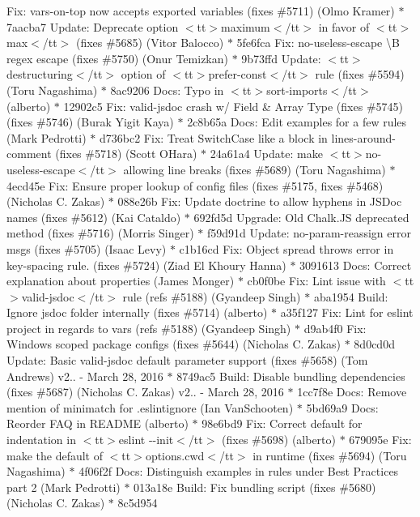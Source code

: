\begin{DoxyItemize}
Fix\+: vars-\/on-\/top now accepts exported variables (fixes \#5711) (\+Olmo Kramer) \texorpdfstring{$\ast$}{*} 7aacba7 Update\+: Deprecate option $<$tt$>$maximum$<$/tt$>$ in favor of $<$tt$>$max$<$/tt$>$ (fixes \#5685) (\+Vitor Balocco) \texorpdfstring{$\ast$}{*} 5fe6fca Fix\+: no-\/useless-\/escape \textbackslash{}\+B regex escape (fixes \#5750) (\+Onur Temizkan) \texorpdfstring{$\ast$}{*} 9b73ffd Update\+: $<$tt$>$destructuring$<$/tt$>$ option of $<$tt$>$prefer-\/const$<$/tt$>$ rule (fixes \#5594) (\+Toru Nagashima) \texorpdfstring{$\ast$}{*} 8ac9206 Docs\+: Typo in $<$tt$>$sort-\/imports$<$/tt$>$ (alberto) \texorpdfstring{$\ast$}{*} 12902c5 Fix\+: valid-\/jsdoc crash w/ Field \& Array Type (fixes \#5745) (fixes \#5746) (\+Burak Yigit Kaya) \texorpdfstring{$\ast$}{*} 2c8b65a Docs\+: Edit examples for a few rules (\+Mark Pedrotti) \texorpdfstring{$\ast$}{*} d736bc2 Fix\+: Treat Switch\+Case like a block in lines-\/around-\/comment (fixes \#5718) (\+Scott O\textquotesingle{}\+Hara) \texorpdfstring{$\ast$}{*} 24a61a4 Update\+: make $<$tt$>$no-\/useless-\/escape$<$/tt$>$ allowing line breaks (fixes \#5689) (\+Toru Nagashima) \texorpdfstring{$\ast$}{*} 4ecd45e Fix\+: Ensure proper lookup of config files (fixes \#5175, fixes \#5468) (\+Nicholas C. Zakas) \texorpdfstring{$\ast$}{*} 088e26b Fix\+: Update doctrine to allow hyphens in JSDoc names (fixes \#5612) (\+Kai Cataldo) \texorpdfstring{$\ast$}{*} 692fd5d Upgrade\+: Old Chalk.\+JS deprecated method (fixes \#5716) (\+Morris Singer) \texorpdfstring{$\ast$}{*} f59d91d Update\+: no-\/param-\/reassign error msgs (fixes \#5705) (\+Isaac Levy) \texorpdfstring{$\ast$}{*} c1b16cd Fix\+: Object spread throws error in key-\/spacing rule. (fixes \#5724) (\+Ziad El Khoury Hanna) \texorpdfstring{$\ast$}{*} 3091613 Docs\+: Correct explanation about properties (\+James Monger) \texorpdfstring{$\ast$}{*} cb0f0be Fix\+: Lint issue with $<$tt$>$valid-\/jsdoc$<$/tt$>$ rule (refs \#5188) (\+Gyandeep Singh) \texorpdfstring{$\ast$}{*} aba1954 Build\+: Ignore jsdoc folder internally (fixes \#5714) (alberto) \texorpdfstring{$\ast$}{*} a35f127 Fix\+: Lint for eslint project in regards to vars (refs \#5188) (\+Gyandeep Singh) \texorpdfstring{$\ast$}{*} d9ab4f0 Fix\+: Windows scoped package configs (fixes \#5644) (\+Nicholas C. Zakas) \texorpdfstring{$\ast$}{*} 8d0cd0d Update\+: Basic valid-\/jsdoc default parameter support (fixes \#5658) (\+Tom Andrews)  v2.. -\/ March 28, 2016  \texorpdfstring{$\ast$}{*} 8749ac5 Build\+: Disable bundling dependencies (fixes \#5687) (\+Nicholas C. Zakas)  v2.. -\/ March 28, 2016  \texorpdfstring{$\ast$}{*} 1cc7f8e Docs\+: Remove mention of minimatch for .\+eslintignore (\+Ian Van\+Schooten) \texorpdfstring{$\ast$}{*} 5bd69a9 Docs\+: Reorder FAQ in README (alberto) \texorpdfstring{$\ast$}{*} 98e6bd9 Fix\+: Correct default for indentation in $<$tt$>$eslint -\/-\/init$<$/tt$>$ (fixes \#5698) (alberto) \texorpdfstring{$\ast$}{*} 679095e Fix\+: make the default of $<$tt$>$options.\+cwd$<$/tt$>$ in runtime (fixes \#5694) (\+Toru Nagashima) \texorpdfstring{$\ast$}{*} 4f06f2f Docs\+: Distinguish examples in rules under Best Practices part 2 (\+Mark Pedrotti) \texorpdfstring{$\ast$}{*} 013a18e Build\+: Fix bundling script (fixes \#5680) (\+Nicholas C. Zakas) \texorpdfstring{$\ast$}{*} 8c5d954 
\end{DoxyItemize}
